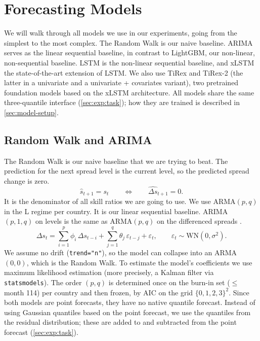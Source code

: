 \section{Forecasting Models}
\label{sec:models}
We will walk through all models we use in our experiments, going from the
simplest to the most complex. The Random Walk is our naive baseline. ARIMA
serves as the linear sequential baseline, in contrast to LightGBM, our
non-linear, non-sequential baseline. LSTM is the non-linear sequential baseline,
and xLSTM the state-of-the-art extension of LSTM. We also use TiRex and TiRex-2
(the latter in a univariate and a univariate + covariates variant), two pretrained foundation models
based on the xLSTM architecture. All models share the same three-quantile
interface (\cref{sec:exp:task}); how they are trained is described in
\cref{sec:model-setup}.

\subsection{Random Walk and ARIMA}
\label{sec:models:classical}
The Random Walk is our naive baseline that we are trying to beat. The prediction
for the next spread level is the current level, so the predicted spread change is
zero.
\begin{equation}
  \hat{s}_{t+1}=s_t
  \qquad\Longleftrightarrow\qquad
  \widehat{\Delta s}_{t+1}=0 .
  \label{eq:rw}
\end{equation}
It is the denominator of all skill ratios we are going to use. We use ARMA$(p,q)$
in the L regime per country. It is our linear sequential baseline. ARIMA
$(p,1,q)$ on levels is the same as ARMA$(p,q)$ on the differenced spreads
\parencite{hamilton1994}.
\begin{equation}
  \Delta s_t=\sum_{i=1}^{p}\phi_i\,\Delta s_{t-i}
            +\sum_{j=1}^{q}\theta_j\,\varepsilon_{t-j}
            +\varepsilon_t ,
  \qquad \varepsilon_t\sim\mathrm{WN}(0,\sigma^2).
  \label{eq:arima}
\end{equation}
We assume no drift (\texttt{trend="n"}), so the model can collapse into an
ARMA$(0,0)$, which is the Random Walk. To estimate the model's coefficients we
use maximum likelihood estimation (more precisely, a Kalman filter via
\texttt{statsmodels}). The order $(p,q)$ is determined once on the burn-in set
($\le$ month 114) per country and then frozen, by AIC on the grid
$\{0,1,2,3\}^2$. Since both models are point forecasts, they have no native
quantile forecast. Instead of using Gaussian quantiles based on the point
forecast, we use the quantiles from the residual distribution; these are added to
and subtracted from the point forecast (\cref{sec:exp:task}).

